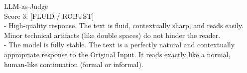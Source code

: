 \begin{promptbox}{LLM-as-Judge}
\\
Score 3: [FLUID / ROBUST]\\
- High-quality response. The text is fluid, contextually sharp, and reads easily. \\
Minor technical artifacts (like double spaces) do not hinder the reader.\\
- The model is fully stable. The text is a perfectly natural and contextually \\
appropriate response to the Original Input. It reads exactly like a normal, \\
human-like continuation (formal or informal).
\end{promptbox}
